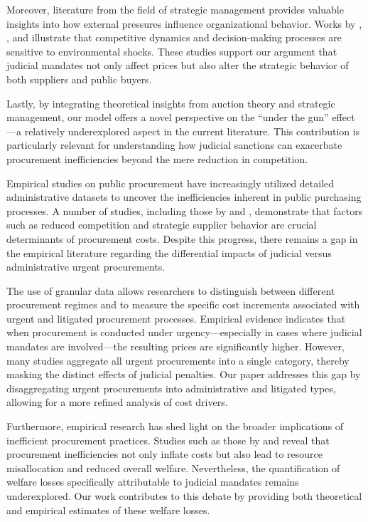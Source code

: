 Moreover, literature from the field of strategic management provides valuable insights into how external pressures influence organizational behavior. Works by \citet{barney1991firm}, \citet{eisenhardt1989making}, and \citet{grant1996toward} illustrate that competitive dynamics and decision-making processes are sensitive to environmental shocks. These studies support our argument that judicial mandates not only affect prices but also alter the strategic behavior of both suppliers and public buyers.

Lastly, by integrating theoretical insights from auction theory and strategic management, our model offers a novel perspective on the “under the gun” effect—a relatively underexplored aspect in the current literature. This contribution is particularly relevant for understanding how judicial sanctions can exacerbate procurement inefficiencies beyond the mere reduction in competition.

Empirical studies on public procurement have increasingly utilized detailed administrative datasets to uncover the inefficiencies inherent in public purchasing processes. A number of studies, including those by \citet{mironov2016corruption} and \citet{lewisfaupel2016can}, demonstrate that factors such as reduced competition and strategic supplier behavior are crucial determinants of procurement costs. Despite this progress, there remains a gap in the empirical literature regarding the differential impacts of judicial versus administrative urgent procurements.

The use of granular data allows researchers to distinguish between different procurement regimes and to measure the specific cost increments associated with urgent and litigated procurement processes. Empirical evidence indicates that when procurement is conducted under urgency—especially in cases where judicial mandates are involved—the resulting prices are significantly higher. However, many studies aggregate all urgent procurements into a single category, thereby masking the distinct effects of judicial penalties. Our paper addresses this gap by disaggregating urgent procurements into administrative and litigated types, allowing for a more refined analysis of cost drivers.

Furthermore, empirical research has shed light on the broader implications of inefficient procurement practices. Studies such as those by \citet{cullen2016performance} and \citet{moore2012cartels} reveal that procurement inefficiencies not only inflate costs but also lead to resource misallocation and reduced overall welfare. Nevertheless, the quantification of welfare losses specifically attributable to judicial mandates remains underexplored. Our work contributes to this debate by providing both theoretical and empirical estimates of these welfare losses.

